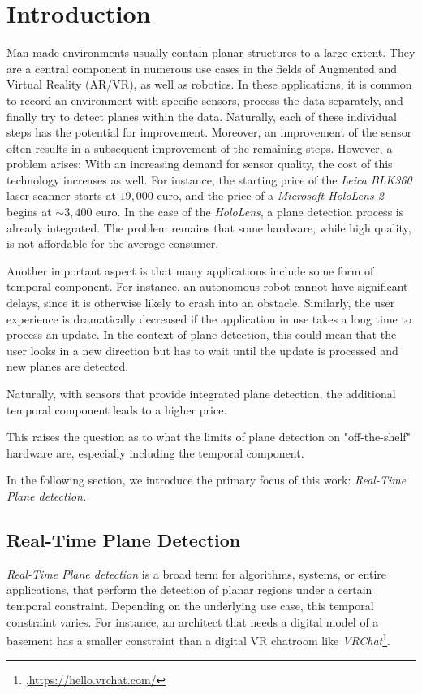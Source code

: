 \documentclass[main.tex]{subfiles}
\begin{document}
\chapter{Introduction}\label{chap:Introduction}

Man-made environments usually contain planar structures to a large extent. 
They are a central component in numerous use cases in the fields of Augmented and Virtual Reality (AR/VR), as well as robotics.
In these applications, it is common to record an environment with specific sensors, 
process the data separately, and finally try to detect planes within the data. 
Naturally, each of these individual steps has the potential for improvement. 
Moreover, an improvement of the sensor often results in a subsequent improvement of the remaining steps.
However, a problem arises: With an increasing demand for sensor quality, the cost of this technology 
increases as well. For instance, the starting price of the \textit{Leica BLK360} laser scanner starts at $19,000$ euro,
 and the price of a \textit{Microsoft HoloLens 2} begins at ${\sim}3,400$ euro. In the case of the \textit{HoloLens},
a plane detection process is already integrated. 
The problem remains that some hardware, while high quality, is not affordable for the average consumer.

Another important aspect is that many applications include some form of temporal component. For instance, 
an autonomous robot cannot have significant delays, since it is otherwise likely to crash into an obstacle.
Similarly, the user experience is dramatically decreased if the application in use takes a long time to process 
an update. In the context of plane detection, this could mean that the user looks in a new direction but has 
to wait until the update is processed and new planes are detected.

Naturally, with sensors that provide integrated plane detection, the additional temporal component leads to a higher price.

This raises the question as to what the limits of plane detection on "off-the-shelf" hardware are, especially including the 
temporal component. 

In the following section, we introduce the primary focus of this work: \textit{Real-Time Plane detection.}
\section{Real-Time Plane Detection}

\textit{Real-Time Plane detection} is a broad term for algorithms, systems, or entire applications, that 
perform the detection of planar regions under a certain temporal constraint. Depending on the underlying 
use case, this temporal constraint varies. For instance, an architect that needs a digital model of a basement has 
a smaller constraint than a digital VR chatroom like \textit{VRChat}\footnote{\href{https://hello.vrchat.com/}{,https://hello.vrchat.com/}}.
\end{document}
